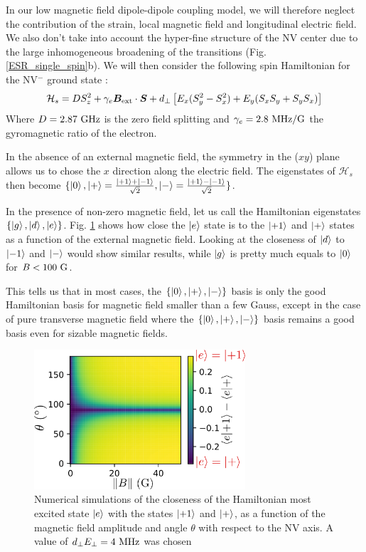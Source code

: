 \documentclass[preprintnumbers,amsmath,amssymb,onecolumn,12pt]{revtex4-2}\usepackage{graphicx}%
\begin{document}
In our low magnetic field dipole-dipole coupling model, we will therefore neglect the contribution of the strain, local magnetic field and longitudinal electric field.  We also don't take into account the hyper-fine structure of the NV center due to the large inhomogeneous broadening of the transitions (Fig. \ref{ESR_single_spin}b).
We will then consider the following spin Hamiltonian for the NV$^-$ ground state : 
\begin{equation}
\label{NV Hamiltonian}
\mathcal{H}_s=D S_z^2 + \gamma_e \bm{B}_{\rm ext} \cdot \bm{S}+ d_\perp \left[ E_x(S_y^2-S_x^2) + E_y(S_xS_y+S_yS_x) \right]
\end{equation}
Where $D=2.87\ \rm GHz$ is the zero field splitting and $\gamma_e=2.8\ \rm MHz/G$ the gyromagnetic ratio of the electron.

In the absence of an external magnetic field, the symmetry in the ($xy$) plane allows us to chose the $x$ direction along the electric field. The eigenstates of $\mathcal{H}_s$ then become $\{ \ket{0},\ket{+}=\frac{\ket{+1}+\ket{-1}}{\sqrt{2}},\ket{-}=\frac{\ket{+1}-\ket{-1}}{\sqrt{2}} \} $.

In the presence of non-zero magnetic field, let us call the Hamiltonian eigenstates $\{ \ket{g},\ket{d}, \ket{e} \} $. Fig. \ref{map etats propres} shows how close the $\ket{e}$ state is to the $\ket{+1}$ and $\ket{+}$ states as a function of the external magnetic field. Looking at the closeness of $\ket{d}$ to $\ket{-1}$ and $\ket{-}$ would show similar results, while $\ket{g}$ is pretty much equals to $\ket{0}$ for $B<100\ \rm G$.

This tells us that in most cases, the $\{ \ket{0},\ket{+},\ket{-} \}$ basis is only the good Hamiltonian basis for magnetic field smaller than a few Gauss, except in the case of pure transverse magnetic field where the $\{ \ket{0},\ket{+},\ket{-} \}$ basis remains a good basis even for sizable magnetic fields.
\begin{figure}
\includegraphics[width=0.7\textwidth]{Figures_SI/map_etats_propres}
\caption{Numerical simulations of the closeness of the Hamiltonian most excited state $\ket{e}$ with the states $\ket{+1}$ and $\ket{+}$, as a function of the magnetic field amplitude and angle $\theta$ with respect to the NV axis. A value of $d_\perp E_\perp = 4\ \rm MHz$ was chosen}
\label{map etats propres}
\end{figure}
\end{document}
